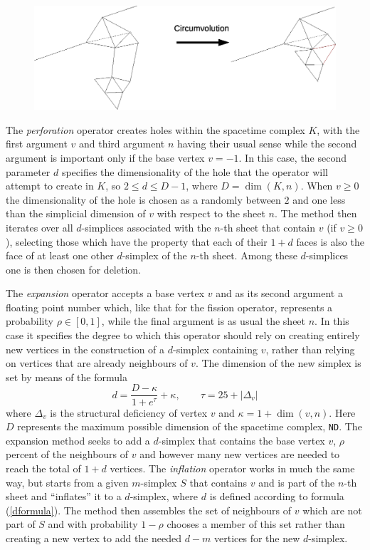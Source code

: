 \documentclass[12pt,letterpaper]{report}
\begin{document}
\begin{figure}[ht]
\centering
\includegraphics[width=5in]{images/circumvolution.eps}
\label{impl_circumvolution}
\end{figure}
The \emph{perforation} operator creates holes within the spacetime complex $K$, with the first argument 
$v$ and third argument $n$ having their usual sense while the second argument is important only if the 
base vertex $v = -1$.  
In this case, the second parameter $d$ specifies the dimensionality of the hole that the operator will 
attempt to create in $K$, so $2\le d\le D-1$, where $D = \dim(K,n)$. When $v \ge 0$ the dimensionality of 
the hole is chosen as a randomly between $2$ and one less than the simplicial dimension of $v$ with respect 
to the sheet $n$. The method then iterates over all $d$-simplices associated with the $n$-th sheet that 
contain $v$ (if $v\ge 0$), selecting those which have the property that each of their $1+d$ faces is also 
the face of at least one other $d$-simplex of the $n$-th sheet. Among these $d$-simplices one is then 
chosen for deletion.

The \emph{expansion} operator accepts a base vertex $v$ and as its second argument a floating 
point number which, like that for the fission operator, represents a probability $\rho \in [0,1]$, while 
the final argument is as usual the sheet $n$. In this 
case it specifies the degree to which this operator should rely on creating entirely new vertices in the 
construction of a $d$-simplex containing $v$, rather than relying on vertices that are already neighbours 
of $v$. The dimension of the new simplex is set by means of the formula 
\begin{equation}
d = \frac {D - \kappa}{1 + e^\tau} + \kappa, \qquad \tau = 25 + |\Delta_v| \label{dformula}
\end{equation}
where $\Delta_v$ is the structural deficiency of vertex $v$ and $\kappa = 1 + \dim(v,n)$. Here $D$ represents the 
maximum possible dimension of the spacetime complex, \texttt{ND}. The expansion method seeks to add a $d$-simplex 
that contains the base vertex $v$, $\rho$ percent of the neighbours of $v$ and however many new vertices are needed 
to reach the total of $1+d$ vertices. The \emph{inflation} operator works in much the same way, but starts from a 
given $m$-simplex $S$ that contains $v$ and is part of the $n$-th sheet and ``inflates'' it to a $d$-simplex, where $d$ 
is defined according to formula (\ref{dformula}). The method then assembles the set of neighbours of $v$ which are 
not part of $S$ and with probability $1-\rho$ chooses a member of this set rather than creating a new vertex to add 
the needed $d - m$ vertices for the new $d$-simplex.
     
\end{document}
